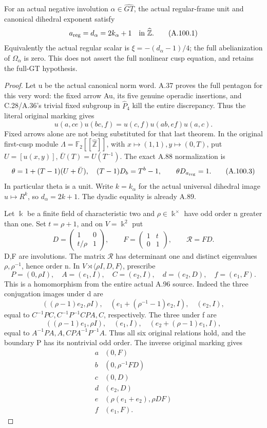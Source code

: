 For an actual negative involution \(\alpha\in\widehat{GT}\), the
actual regular-frame unit and canonical dihedral exponent satisfy
\[
 a_{\rm reg}=d_\alpha=2k_\alpha+1
             \quad\hbox{in }\widehat{\mathbb Z}.
 \tag{A.100.1}
\]
Equivalently the actual regular scalar is
\(\xi=-(d_\alpha-1)/4\); the full abelianization of
\(\Omega_\alpha\) is zero. This does not assert the full nonlinear
cusp equation, and retains the full-GT hypothesis.

\begin{proof}
Let u be the actual canonical norm word. A.37 proves the full
pentagon for this very word: the fixed arrow Au, its five genuine
operadic insertions, and C.28/A.36's trivial fixed subgroup in
\(\widehat P_4\) kill the entire discrepancy. Thus the literal
original marking gives
\[
 u(a,ce)u(bc,f)=u(c,f)u(ab,ef)u(a,c).
 \tag{A.100.2}
\]
Fixed arrows alone are not being substituted for that last theorem.
In the original first-cusp module
\(\Lambda=\mathbb F_2[[\widehat{\mathbb Z}]]\), with
\(x\mapsto(1,1),y\mapsto(0,T)\), put
\(U=[u(x,y)]\), \(\bar U(T)=U(T^{-1})\). The exact A.88
normalization is
\[
 \theta=1+(T-1)(U+\bar U),\quad
 (T-1)D_b=T^b-1,\qquad \theta D_{a_{\rm reg}}=1.
 \tag{A.100.3}
\]
In particular theta is a unit. Write \(k=k_\alpha\) for the
actual universal dihedral image \(u\mapsto R^k\), so
\(d_\alpha=2k+1\). The dyadic equality is already A.89.

Let \(\Bbbk\) be a finite field of characteristic two and
\(\rho\in\Bbbk^\times\) have odd order n greater than one.
Set \(t=\rho+1\), and on \(V=\Bbbk^2\) put
\[
 D=\begin{pmatrix}1&0\\t/\rho&1\end{pmatrix},\qquad
 F=\begin{pmatrix}1&t\\0&1\end{pmatrix},\qquad
 \mathcal R=FD.
 \tag{A.100.4}
\]
D,F are involutions. The matrix \(\mathcal R\) has determinant
one and distinct eigenvalues \(\rho,\rho^{-1}\), hence order n.
In \(V\rtimes\langle\rho I,D,F\rangle\), prescribe
\[
 P=(0,\rho I),\quad A=(e_1,I),\quad C=(e_2,I),
 \quad d=(e_2,D),\quad f=(e_1,F).
 \tag{A.100.5}
\]
This is a homomorphism from the entire actual A.96 source.
Indeed the three conjugation images under d are
\[
 ((\rho-1)e_2,\rho I),\quad
 (e_1+(\rho^{-1}-1)e_2,I),\quad(e_2,I),
\]
equal to \(C^{-1}PC,C^{-1}P^{-1}CPA,C\), respectively.
The three under f are
\[
 ((\rho-1)e_1,\rho I),\quad(e_1,I),
 \quad(e_2+(\rho-1)e_1,I),
\]
equal to \(A^{-1}PA,A,CPA^{-1}P^{-1}A\). Thus all six original
relations hold, and the boundary P has its nontrivial odd order.
The inverse original marking gives
\[
\begin{array}{c|c}
 a&(0,F)\\ b&(0,\rho^{-1}FD)\\ c&(0,D)\\
 d&(e_2,D)\\ e&(\rho(e_1+e_2),\rho DF)\\ f&(e_1,F).
\end{array}
\tag{A.100.6}
\]


\end{proof}
